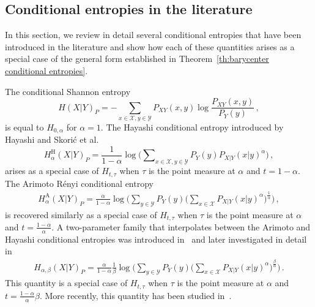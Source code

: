 \documentclass[aps,pra,11pt,onecolumn,nofootinbib,tightenlines]{revtex4-2}
\theoremstyle{definition}
\newcommand{\X}{\mathcal{X}}
\newcommand{\Y}{\mathcal{Y}}
\begin{document}
\bigskip


\subsection{Conditional entropies in the literature}
\label{sec: literature}
In this section, we review in detail several conditional entropies that have been introduced in the literature and show how each of these quantities arises as a special case of the general form established in Theorem~\ref{th:barycenter conditional entropies}.



The conditional Shannon entropy
\begin{equation}
    H(X|Y)_P=-\sum_{x \in \X,y\in\Y} P_{XY}(x,y)\log{\frac{P_{XY}(x,y)}{P_Y(y)}} \,,
\end{equation}
is equal to \(H_{0,\alpha}\) for \(\alpha = 1\).
The Hayashi conditional entropy introduced by Hayashi and Skorić et al.~\cite{hayashi2011exponential,vskoric2011sharp}
\begin{equation}
H^\text{H}_{\alpha}(X|Y)_P=\frac{1}{1-\alpha}\log{\Big(\sum\nolimits_{x\in\X,y\in\Y} P_Y(y) P_{X|Y}(x|y)^\alpha\Big)} \,,
\end{equation}
arises as a special case of $H_{t,\tau}$ when $\tau$ is the point measure at $\alpha$ and $t = 1 - \alpha$. The Arimoto Rényi conditional entropy~\cite{arimoto1977information}
\begin{align}
H^\text{A}_{\alpha}(X|Y)_P=\frac{\alpha}{1-\alpha}\log{\bigg(\sum_{y\in \Y} P_Y(y)\Big(\sum_{x \in \X} P_{X|Y}(x|y)^\alpha\Big)^\frac{1}{\alpha}\bigg)} \,,
\end{align}
is recovered similarly as a special case of $H_{t,\tau}$ when $\tau$ is the point measure at $\alpha$ and $t = \frac{1 - \alpha}{\alpha}$. A two-parameter family that interpolates between the Arimoto and Hayashi conditional entropies was introduced in~\cite{hayashi2016equivocations} and later investigated in detail in~\cite{rubboli2024quantum}
\begin{align}
\label{eq: H alpha beta}
H_{\alpha,\beta}(X|Y)_P=\frac{\alpha}{1-\alpha}\frac{1}{\beta}\log{\bigg(\sum_{y \in \Y} P_Y(y)\Big(\sum_{x \in \X} P_{X|Y}(x|y)^\alpha\Big)^\frac{\beta} {\alpha}\bigg)} \,.
\end{align}
This quantity is a special case of $H_{t,\tau}$ when $\tau$ is the point measure at $\alpha$ and $t = \frac{1 - \alpha}{\alpha} \beta$. More recently, this quantity has been studied in~\cite{li2025two}.
\end{document}
